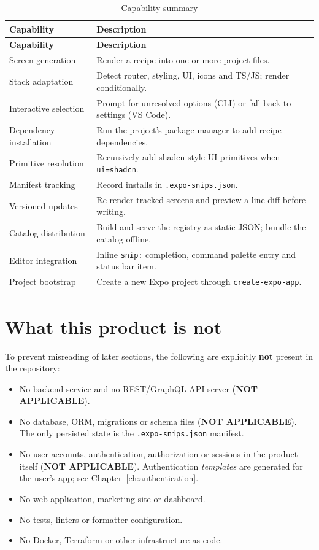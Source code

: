 \begin{longtable}{@{}L{4.6cm}L{9.8cm}@{}}
\caption{Capability summary}\\
\toprule
\textbf{Capability} & \textbf{Description} \\
\midrule
\endfirsthead
\toprule
\textbf{Capability} & \textbf{Description} \\
\midrule
\endhead
Screen generation & Render a recipe into one or more project files. \\
Stack adaptation & Detect router, styling, UI, icons and TS/JS; render conditionally. \\
Interactive selection & Prompt for unresolved options (CLI) or fall back to settings (VS Code). \\
Dependency installation & Run the project's package manager to add recipe dependencies. \\
Primitive resolution & Recursively add shadcn-style UI primitives when \texttt{ui=shadcn}. \\
Manifest tracking & Record installs in \texttt{.expo-snips.json}. \\
Versioned updates & Re-render tracked screens and preview a line diff before writing. \\
Catalog distribution & Build and serve the registry as static JSON; bundle the catalog offline. \\
Editor integration & Inline \texttt{snip:} completion, command palette entry and status bar item. \\
Project bootstrap & Create a new Expo project through \texttt{create-expo-app}. \\
\bottomrule
\end{longtable}

\section{What this product is not}

To prevent misreading of later sections, the following are explicitly \textbf{not}
present in the repository:

\begin{itemize}
  \item No backend service and no REST/GraphQL API server
        (\textbf{NOT APPLICABLE}).
  \item No database, ORM, migrations or schema files
        (\textbf{NOT APPLICABLE}). The only persisted state is the
        \texttt{.expo-snips.json} manifest.
  \item No user accounts, authentication, authorization or sessions in the product
        itself (\textbf{NOT APPLICABLE}). Authentication \emph{templates} are
        generated for the user's app; see Chapter~\ref{ch:authentication}.
  \item No web application, marketing site or dashboard.
  \item No tests, linters or formatter configuration.
  \item No Docker, Terraform or other infrastructure-as-code.
\end{itemize}


